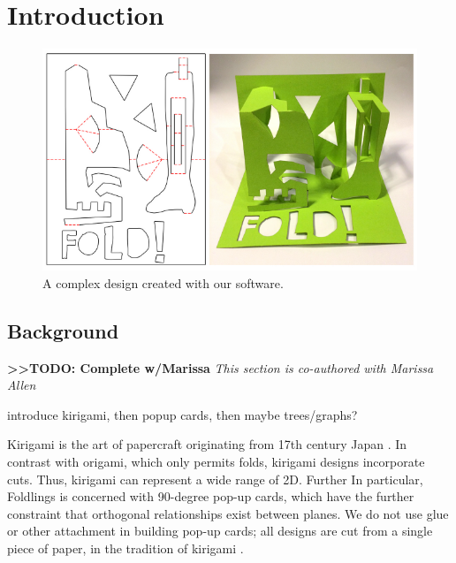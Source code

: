 \chapter{Introduction}

\begin{figure}[htbp]
\centering
\includegraphics{figures/shared/01_Background/complexFoldlings.pdf}
\caption{A complex design created with our software.}
\end{figure}

\section{Background}\label{background}

\textbf{\textgreater{}\textgreater{}TODO: Complete w/Marissa} \emph{This
section is co-authored with Marissa Allen}

introduce kirigami, then popup cards, then maybe trees/graphs?

Kirigami is the art of papercraft originating from 17th century Japan
\citet{temko1978magic}. In contrast with origami, which only permits
folds, kirigami designs incorporate cuts. Thus, kirigami can represent a
wide range of 2D. Further In particular, Foldlings is concerned with
90-degree pop-up cards, which have the further constraint that
orthogonal relationships exist between planes. We do not use glue or
other attachment in building pop-up cards; all designs are cut from a
single piece of paper, in the tradition of kirigami
\citet{temko1978magic}.

